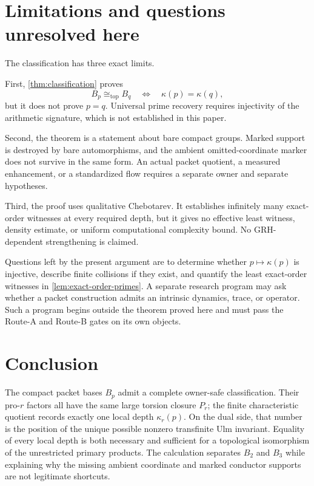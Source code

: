 \documentclass[11pt]{article}
\theoremstyle{definition}
\newcommand{\TopIso}{\cong_{\mathrm{top}}}
\begin{document}
\section{Limitations and questions unresolved here}\label{sec:limitations}

The classification has three exact limits.

First, \cref{thm:classification} proves
\[
B_p\TopIso B_q\quad\Longleftrightarrow\quad\kappa(p)=\kappa(q),
\]
but it does not prove $p=q$.  Universal prime recovery requires injectivity of
the arithmetic signature, which is not established in this paper.

Second, the theorem is a statement about bare compact groups.  Marked support
is destroyed by bare automorphisms, and the ambient omitted-coordinate marker
does not survive in the same form.  An actual packet quotient, a measured
enhancement, or a standardized flow requires a separate owner and separate
hypotheses.

Third, the proof uses qualitative Chebotarev.  It establishes infinitely many
exact-order witnesses at every required depth, but it gives no effective
least witness, density estimate, or uniform computational complexity bound.
No GRH-dependent strengthening is claimed.

Questions left by the present argument are to determine whether
$p\mapsto\kappa(p)$ is injective, describe finite collisions if they exist,
and quantify the
least exact-order witnesses in \cref{lem:exact-order-primes}.  A separate
research program may ask whether a packet construction admits an intrinsic
dynamics, trace, or operator.  Such a program begins outside the theorem
proved here and must pass the Route-A and Route-B gates on its own objects.

\section{Conclusion}\label{sec:conclusion}

The compact packet bases $B_p$ admit a complete owner-safe classification.
Their pro-$r$ factors all have the same large torsion closure $P_r$; the
finite characteristic quotient records exactly one local depth
$\kappa_r(p)$.  On the dual side, that number is the position of the unique
possible nonzero transfinite Ulm invariant.  Equality of every local depth is
both necessary and sufficient for a topological isomorphism of the unrestricted
primary products.  The calculation separates $B_2$ and $B_3$ while explaining
why the missing ambient coordinate and marked conductor supports are not
legitimate shortcuts.
\end{document}
